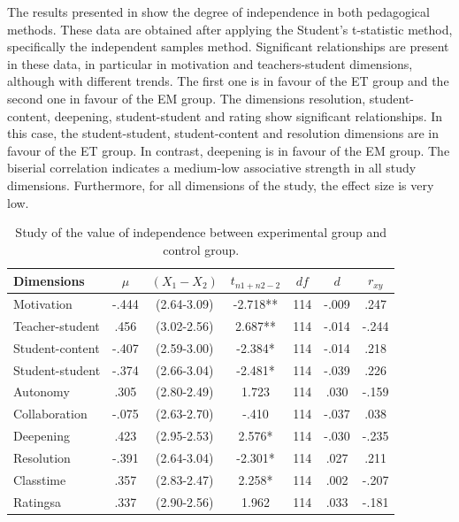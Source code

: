 \documentclass{textolivre}
\begin{document}
The results presented in  show the degree of independence in both pedagogical methods. These data are obtained after applying the Student's t-statistic method, specifically the independent samples method. Significant relationships are present in these data, in particular in motivation and teachers-student dimensions, although with different trends. The first one is in favour of the ET group and the second one in favour of the EM group. The dimensions resolution, student-content, deepening, student-student and rating show significant relationships. In this case, the student-student, student-content and resolution dimensions are in favour of the ET group. In contrast, deepening is in favour of the EM group. The biserial correlation indicates a medium-low associative strength in all study dimensions. Furthermore, for all dimensions of the study, the effect size is very low.

\begin{table}[htpb]
\caption{Study of the value of independence between experimental group and control group.}
\label{tab3}
\centering
\begin{tabular}{lS[table-format=1.3]SSS[table-format=3]SS}%
\toprule
Dimensions & {$\mu$} & {$(X_1 - X_2)$} & {$t_{n1+n2-2}$} & {$df$} & {$d$} & {$r_{xy}$} \\
\midrule
Motivation & -.444 & {(2.64-3.09)} & -2.718** & 114 & -.009 & .247
\\
Teacher-student & .456 & {(3.02-2.56)} & 2.687** & 114 & -.014 & -.244
\\
Student-content & -.407 & {(2.59-3.00)} & -2.384* & 114 & -.014 & .218
\\
Student-student & -.374 & {(2.66-3.04)} & -2.481* & 114 & -.039 & .226
\\
Autonomy & .305 & {(2.80-2.49)} & 1.723 & 114 & .030 & -.159
\\
Collaboration & -.075 & {(2.63-2.70)} & -.410 & 114 & -.037 & .038
\\
Deepening & .423 & {(2.95-2.53)}	& 2.576* & 114 & -.030 & -.235
\\
Resolution & -.391 & {(2.64-3.04)} & -2.301*	& 114 & .027 & .211
\\
Classtime & .357 & {(2.83-2.47)} & 2.258* & 114 & .002 & -.207
\\
Ratingsa & .337 & {(2.90-2.56)} & 1.962	& 114 & .033 & -.181
\\
\bottomrule
\end{tabular}
\centering
{}
\end{table}
\end{document}
